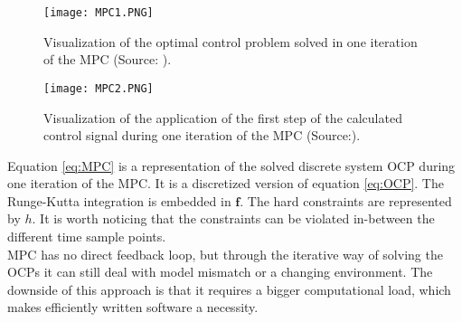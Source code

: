\begin{figure}[h!]
	\centering
	\texttt{[image: MPC1.PNG]}
	\caption{Visualization of the optimal control problem solved in one iteration of the MPC (Source: \cite{Patrinos2019}).}
	\label{fig:MPC1}
\end{figure}

\begin{figure}[h!]
	\centering
	\texttt{[image: MPC2.PNG]}
	\caption{Visualization of the application of the first step of the calculated control signal during one iteration of the MPC (Source:\cite{Patrinos2019}).}
	\label{fig:MPC2}
\end{figure}

Equation \ref{eq:MPC} is a representation of the solved discrete system OCP during one iteration of the MPC. It is a discretized version of equation \ref{eq:OCP}. The Runge-Kutta integration is embedded in $\bm{f}$. The hard constraints are represented by $h$. It is worth noticing that the constraints can be violated in-between the different time sample points.\\

MPC has no direct feedback loop, but through the iterative way of solving the OCPs it can still deal with model mismatch or a changing environment. The downside of this approach is that it requires a bigger computational load, which makes efficiently written software a necessity. 


